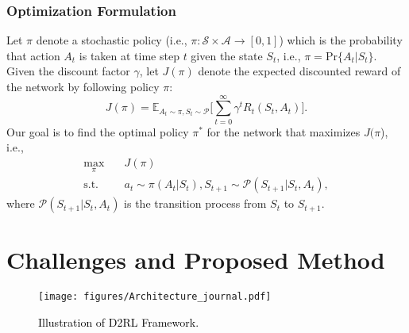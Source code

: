 \documentclass[comsoc,journal]{IEEEtran}
\begin{document}


\subsubsection{Optimization Formulation}
Let $\mathcal{\pi}$ denote a stochastic policy (i.e., $\mathcal{\pi}: \mathcal{S} \times \mathcal{A} \rightarrow [0, 1]$) which is the probability that action $A_t$ is taken at time step $t$ given the state $S_t$, i.e., $\mathcal{\pi} = \text{Pr}\{A_t|S_t\}$. Given the discount factor $\gamma$, let $J(\mathcal{\pi})$ denote the expected discounted reward of the network by following policy $\mathcal{\pi}$:
\begin{equation}
\label{eq:discounted-reward}
J(\mathcal{\pi}) = \mathbb{E}_{A_t \sim \mathcal{\pi}, S_t \sim \mathcal{P}} \Big[\sum_{t=0}^{\infty}\gamma^t R_t(S_t, A_t)\Big].
\end{equation}
Our goal is to find the optimal policy $\mathcal{\pi}^*$ for the network that maximizes $J(\mathcal{\pi}$), i.e., 
\begin{equation}
\label{eq:max-return}
\begin{aligned}
\max_{\mathcal{\pi}} \quad & J(\mathcal{\pi})\\
\textrm{s.t.} \quad & a_t \sim \mathcal{\pi}(A_t|S_t), S_{t+1} \sim \mathcal{P}(S_{t+1}|S_t, A_t),
\end{aligned}
\end{equation}
where $\mathcal{P}(S_{t+1}|S_t, A_t)$ is the transition process from $S_t$ to $S_{t+1}$.
\vspace{-6pt}
\section{Challenges and Proposed Method}
\begin{figure*}[t]
  \centering
  \texttt{[image: figures/Architecture\_journal.pdf]}\\
  \caption{\textcolor{black}{Illustration of D2RL Framework. }}
  \label{fig:Archi}
\end{figure*}
\end{document}
